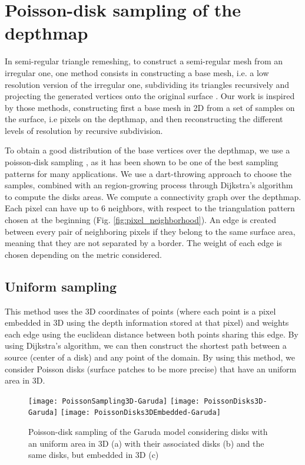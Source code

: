 
\section{Poisson-disk sampling of the depthmap}
\label{sec:poisson_sampling}

In semi-regular triangle remeshing, to construct a semi-regular mesh from an irregular one, one method consists in constructing a base mesh, i.e. a low resolution version of the irregular one, subdividing its triangles recursively and projecting the generated vertices onto the original surface \cite{PRS15}. Our work is inspired by those methods, constructing first a base mesh in 2D from a set of samples on the surface, i.e pixels on the depthmap, and then reconstructing the different levels of resolution by recursive subdivision.

To obtain a good distribution of the base vertices over the depthmap, we use a poisson-disk sampling \cite{Coo86}, as it has been shown to be one of the best sampling patterns for many applications. 
We use a dart-throwing approach to choose the samples, combined with an region-growing process through Dijkstra's algorithm \cite{Dij59} to compute the disks areas.
We compute a connectivity graph over the depthmap. Each pixel can have up to 6 neighbors, with respect to the triangulation pattern chosen at the beginning (Fig. \ref{fig:pixel_neighborhood}).
An edge is created between every pair of neighboring pixels if they belong to the same surface area, meaning that they are not separated by a border. 
The weight of each edge is chosen depending on the metric considered.

\subsection{Uniform sampling}
This method uses the 3D coordinates of points (where each point is a pixel embedded in 3D using the depth information stored at that pixel) and weights each edge using the euclidean distance between both points sharing this edge.
By using Dijkstra's algorithm, we can then construct the shortest path between a source (center of a disk) and any point of the domain.
By using this method, we consider Poisson disks (surface patches to be more precise) that have an uniform area in 3D.

\begin{figure}[ht]
\centering
\texttt{[image: PoissonSampling3D-Garuda]}
\texttt{[image: PoissonDisks3D-Garuda]}
\texttt{[image: PoissonDisks3DEmbedded-Garuda]}
\caption{Poisson-disk sampling of the Garuda model considering disks with an uniform area in 3D (a) with their associated disks (b) and the same disks, but embedded in 3D (c)}
\label{fig:poisson_sampling_3d}
\end{figure}

